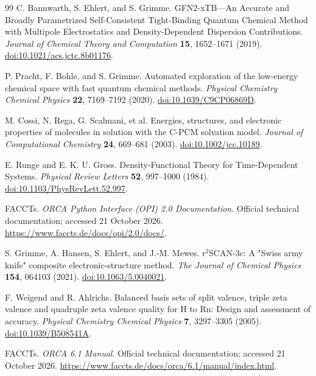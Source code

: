 \documentclass[a4paper,11pt]{article}
\begin{document}
\begin{thebibliography}{99}
  C. Bannwarth, S. Ehlert, and S. Grimme.
  GFN2-xTB---An Accurate and Broadly Parametrized Self-Consistent Tight-Binding Quantum Chemical
  Method with Multipole Electrostatics and Density-Dependent Dispersion Contributions.
  \emph{Journal of Chemical Theory and Computation} \textbf{15}, 1652--1671 (2019).
  \href{https://doi.org/10.1021/acs.jctc.8b01176}{doi:10.1021/acs.jctc.8b01176}.

  P. Pracht, F. Bohle, and S. Grimme.
  Automated exploration of the low-energy chemical space with fast quantum chemical methods.
  \emph{Physical Chemistry Chemical Physics} \textbf{22}, 7169--7192 (2020).
  \href{https://doi.org/10.1039/C9CP06869D}{doi:10.1039/C9CP06869D}.

  M. Cossi, N. Rega, G. Scalmani, et al.
  Energies, structures, and electronic properties of molecules in solution with the C-PCM solvation
  model.
  \emph{Journal of Computational Chemistry} \textbf{24}, 669--681 (2003).
  \href{https://doi.org/10.1002/jcc.10189}{doi:10.1002/jcc.10189}.

  E. Runge and E. K. U. Gross.
  Density-Functional Theory for Time-Dependent Systems.
  \emph{Physical Review Letters} \textbf{52}, 997--1000 (1984).
  \href{https://doi.org/10.1103/PhysRevLett.52.997}{doi:10.1103/PhysRevLett.52.997}.

  FACCTs.
  \emph{ORCA Python Interface (OPI) 2.0 Documentation}.
  Official technical documentation; accessed 21 October 2026.
  \url{https://www.faccts.de/docs/opi/2.0/docs/}.

  S. Grimme, A. Hansen, S. Ehlert, and J.-M. Mewes.
  r$^{2}$SCAN-3c: A "Swiss army knife" composite electronic-structure method.
  \emph{The Journal of Chemical Physics} \textbf{154}, 064103 (2021).
  \href{https://doi.org/10.1063/5.0040021}{doi:10.1063/5.0040021}.

  F. Weigend and R. Ahlrichs.
  Balanced basis sets of split valence, triple zeta valence and quadruple zeta valence quality for H
  to Rn: Design and assessment of accuracy.
  \emph{Physical Chemistry Chemical Physics} \textbf{7}, 3297--3305 (2005).
  \href{https://doi.org/10.1039/B508541A}{doi:10.1039/B508541A}.


  FACCTs.
  \emph{ORCA 6.1 Manual}.
  Official technical documentation; accessed 21 October 2026.
  \url{https://www.faccts.de/docs/orca/6.1/manual/index.html}.

\end{thebibliography}
\endgroup
\end{document}

